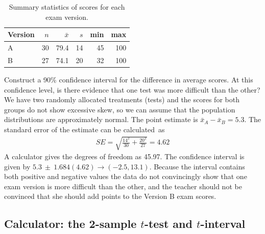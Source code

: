 \begin{table}[hht]
\centering
\begin{tabular}{l rrrrr}
\hline
Version\hspace{2mm}	& $n$	& $\bar{x}$	& $s$	& min	& max  \\
\hline
A		& 30		& 79.4		& 14 	& 45		& 100 \\
B		& 27		& 74.1		& 20		& 32		& 100 \\
\hline
\end{tabular}
\caption{Summary statistics of scores for each exam version.}
\label{summaryStatsForTwoVersionsOfExams2nd}
\end{table}

\textA{\newpage}

\begin{example}{Construct a 90\% confidence interval for the difference in average scores. At this confidence level, is there evidence that one test was more difficult than the other?}
We have two randomly allocated treatments (tests) and the scores for both groups do not show excessive skew, so we can assume that the population distributions are approximately normal. The point estimate is $\bar{x}_A - \bar{x}_B = 5.3$. The standard error of the estimate can be calculated~as
\begin{eqnarray*}
SE = \sqrt{\frac{14^2}{30} + \frac{20^2}{27}} = 4.62
\end{eqnarray*}
A calculator gives the degrees of freedom as 45.97.
The confidence interval is given by $5.3\ \pm \ 1.684(4.62)\to (-2.5, 13.1)$. Because the interval contains both positive and negative values the data do not convincingly show that one exam version is more difficult than the other, and the teacher should not be convinced that she should add points to the Version B exam scores.
\end{example}


\subsection{Calculator: the 2-sample $t$-test and $t$-interval}

